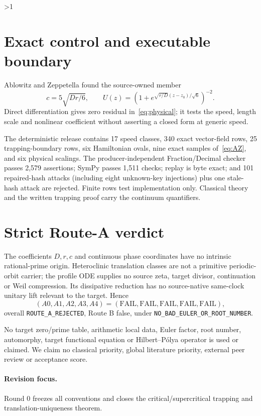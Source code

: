 \documentclass[9pt]{extarticle}
\begin{document}
\ifnum\CRevisionRound>1
\section{Exact control and executable boundary}
Ablowitz and Zeppetella found the source-owned member~\cite{AZ79}
\begin{equation}\label{eq:AZ}
 c=5\sqrt{Dr/6},\qquad
 U(z)=\left(1+e^{\sqrt{r/D}(z-z_0)/\sqrt6}\right)^{-2}.
\end{equation}
Direct differentiation gives zero residual in~\eqref{eq:physical}; it tests
the speed, length scale and nonlinear coefficient without asserting a closed
form at generic speed.

The deterministic release contains 17 speed classes, 340 exact vector-field
rows, 25 trapping-boundary rows, six Hamiltonian ovals, nine exact
samples of~\eqref{eq:AZ}, and six physical scalings.  The producer-independent
Fraction/Decimal checker passes 2,579 assertions; SymPy passes 1,511 checks;
replay is byte exact; and 101 repaired-hash attacks (including eight
unknown-key injections) plus one stale-hash attack are rejected.  Finite rows
test implementation only.  Classical theory and the written trapping proof
carry the continuum quantifiers.

\section{Strict Route-A verdict}
The coefficients $D,r,c$ and continuous phase coordinates have no intrinsic
rational-prime origin.  Heteroclinic translation classes are not a primitive
periodic-orbit carrier; the profile ODE supplies no source zeta, target
divisor, continuation or Weil compression.  Its dissipative reduction has no
source-native same-clock unitary lift relevant to the target.  Hence
\[
 (A0,A1,A2,A3,A4)=(\mathrm{FAIL},\mathrm{FAIL},\mathrm{FAIL},
 \mathrm{FAIL},\mathrm{FAIL}),
\]
overall \texttt{ROUTE\_A\_REJECTED}, Route B false, under
\texttt{NO\_BAD\_EULER\_OR\_ROOT\_NUMBER}.

No target zero/prime table, arithmetic local data, Euler factor, root number,
automorphy, target functional equation or Hilbert--P\'olya operator is used or
claimed.  We claim no classical priority, global literature priority,
external peer review or acceptance score.
\fi

\ifcase\CRevisionRound
\paragraph{Revision focus.} Round 0 freezes all conventions and closes the
critical/supercritical trapping and translation-uniqueness theorem.
\or
\end{document}
